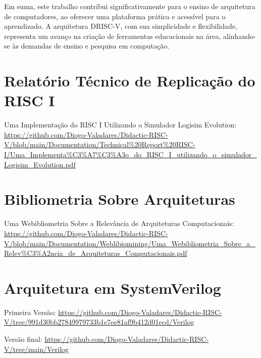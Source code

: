\documentclass[
	12pt,				%
	openright,			%
	oneside,			%
	a4paper,			%
	english,			%
	french,				%
	spanish,			%
	brazil,				%
	]{abntex2}
\begin{document}
Em suma, este trabalho contribui significativamente para o ensino de arquitetura de computadores, ao oferecer uma plataforma prática e acessível para o aprendizado. A arquitetura DRISC-V, com sua simplicidade e flexibilidade, representa um avanço na criação de ferramentas educacionais na área, alinhando-se às demandas de ensino e pesquisa em computação.



\postextual

%

%
%


\begin{apendicesenv}

\partapendices
\chapter{Relatório Técnico de Replicação do RISC I}\label{ap:tech_report}
Uma Implementação do RISC I Utilizando o Simulador Logisim Evolution: \url{https://github.com/Diogo-Valadares/Didactic-RISC-V/blob/main/Documentation/Technical%20Report%20RISC-I/Uma_Implementa%C3%A7%C3%A3o_do_RISC_I_utilizando_o_simulador_Logisim_Evolution.pdf}

\chapter{Bibliometria Sobre Arquiteturas}\label{ap:bibliometry}
Uma Webibliometria Sobre a Relevância de Arquiteturas Computacionais: \url{https://github.com/Diogo-Valadares/Didactic-RISC-V/blob/main/Documentation/Weblibiomining/Uma_Webibliometria_Sobre_a_Relev%C3%A2ncia_de_Arquiteturas_Computacionais.pdf}

\chapter{Arquitetura em SystemVerilog}\label{ap:arquitetura_sv}
Primeira Versão: \url{https://github.com/Diogo-Valadares/Didactic-RISC-V/tree/991d30bb27849979733b1e7ee81af9b412d01ecd/Verilog}

Versão final: \url{https://github.com/Diogo-Valadares/Didactic-RISC-V/tree/main/Verilog}
% 
\end{apendicesenv}
\end{document}
